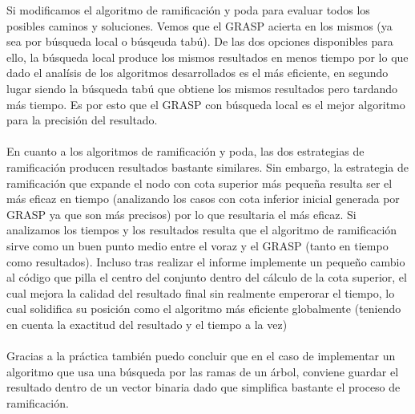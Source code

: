 Si modificamos el algoritmo de ramificación y poda para evaluar todos los posibles caminos y soluciones. Vemos que el GRASP acierta en los mismos (ya sea por búsqueda local o búsqeuda tabú). De las dos opciones disponibles para ello, la búsqueda local produce los mismos resultados en menos tiempo por lo que dado el analísis de los algoritmos desarrollados es el más eficiente, en segundo lugar siendo la búsqueda tabú que obtiene los mismos resultados pero tardando más tiempo. Es por esto que el GRASP con búsqueda local es el mejor algoritmo para la precisión del resultado.
\\
\\
En cuanto a los algoritmos de ramificación y poda, las dos estrategias de ramificación producen resultados bastante similares. Sin embargo, la estrategia de ramificación que expande
el nodo con cota superior más pequeña resulta ser el más eficaz en tiempo (analizando los casos con cota inferior inicial generada por GRASP ya que son más precisos) por lo que resultaria el más eficaz. Si analizamos los tiempos y los resultados resulta que el algoritmo de ramificación sirve como un buen punto medio entre el voraz y el GRASP (tanto en tiempo como resultados). Incluso tras realizar el informe implemente un pequeño cambio al código que pilla el centro del conjunto dentro del cálculo de la cota superior, el cual mejora la calidad del resultado final sin realmente emperorar el tiempo, lo cual solidifica su posición como el algoritmo más eficiente globalmente (teniendo en cuenta la exactitud del resultado y el tiempo a la vez)
\\
\\
Gracias a la práctica también puedo concluir que en el caso de implementar un algoritmo que usa una búsqueda por las ramas de un árbol, conviene guardar el resultado dentro de un vector binaria dado que simplifica bastante el proceso de ramificación. 